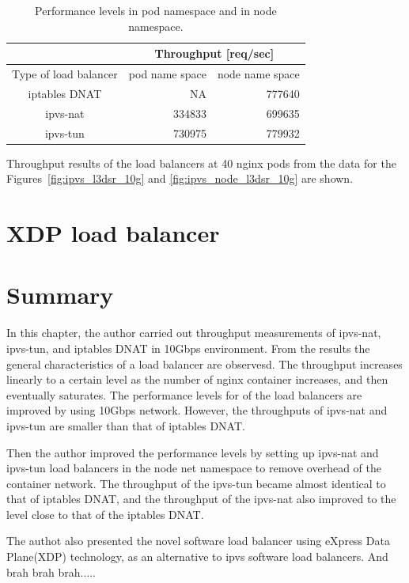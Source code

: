 \begin{table}[h]
  \centering
  \begin{tabular}{|l|r|r|}
    \hline
    & \multicolumn{2}{c|}{Throughput {[}req/sec{]}} \\ \hline
    Type of load balancer & \multicolumn{1}{c|}{pod name space} & \multicolumn{1}{c|}{node name space} \\ \hline
    \multicolumn{1}{c|}{iptables DNAT} & NA & \cellcolor[HTML]{ECF4FF}777640 \\ \hline
    \multicolumn{1}{c|}{ipvs-nat} & \cellcolor[HTML]{ECF4FF}334833 & \cellcolor[HTML]{FFF3F3}699635 \\ \hline
    \multicolumn{1}{c|}{ipvs-tun} & \cellcolor[HTML]{ECF4FF}730975 & \cellcolor[HTML]{FFF3F3}779932 \\ \hline
  \end{tabular}
  \caption{Performance levels in pod namespace and in node namespace.}
  \raggedright
  Throughput results of the load balancers at 40 nginx pods from the data for the Figures~\ref{fig:ipvs_l3dsr_10g} and \ref{fig:ipvs_node_l3dsr_10g} are shown.
  \label{table:nat_tun_dnat_pod_node}
\end{table}

\FloatBarrier
\section{XDP load balancer}

\section{Summary}

In this chapter, the author carried out throughput measurements of ipvs-nat, ipvs-tun, and iptables DNAT in 10Gbps environment.
From the results the general characteristics of a load balancer are observesd.
The throughput increases linearly to a certain level as the number of nginx container increases, and then eventually saturates.
The performance levels for of the load balancers are improved by using 10Gbps network.
However, the throughputs of ipvs-nat and ipvs-tun are smaller than that of iptables DNAT.

Then the author improved the performance levels by setting up ipvs-nat and ipvs-tun load balancers in the node net namespace to remove overhead of the container network.
The throughput of the ipvs-tun became almost identical to that of iptables DNAT, and the throughput of the ipvs-nat also improved to the level close to that of the iptables DNAT.

The authot also presented the novel software load balancer using eXpress Data Plane(XDP) technology, as an alternative to ipvs software load balancers.
And brah brah brah.....



